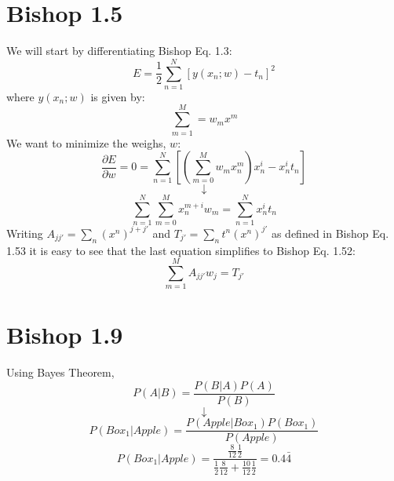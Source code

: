 \documentclass[12pt, letterpaper]{article}
\begin{document}
\section{Bishop 1.5}
We will start by differentiating Bishop Eq. 1.3:
\begin{equation}
E = \frac{1}{2} \sum_{n=1}^{N} [ y(x_n ; w) - t_n]^2
\end{equation}
where $y(x_n ; w)$ is given by:
\begin{equation}
\sum_{m=1}^{M} = w_m x^m
\end{equation}
We want to minimize the weighs, $w$:
\begin{equation}
\frac{\partial E}{\partial w} = 0 = \sum_{n=1}^{N} [( \sum_{m=0}^{M} w_m x_n^m) x_n^i - x_n^i t_n]
\end{equation}
\begin{equation}
\downarrow
\end{equation}
\begin{equation}
\sum_{n=1}^{N} \sum_{m=0}^{M} x_n^{m+i} w_m = \sum_{n=1}^{N} x_n^i t_n
\end{equation}
Writing $A_{j j'} = \sum_{n} (x^n)^{j + j'}$ and $T_{j'} = \sum_{n} t^n (x^n)^{j'}$ as defined in Bishop Eq. 1.53 it is easy to see that the last equation simplifies to Bishop Eq. 1.52:
\begin{equation}
 \sum_{m=1}^{M} A_{j j'} w_j = T_{j'}
\end{equation}

\section*{Bishop 1.9 }
Using Bayes Theorem, 
\begin{equation}
P(A|B) = \frac{P(B|A) P(A)}{P(B)}
\end{equation}
\begin{equation}
\downarrow
\end{equation}
\begin{equation}
P(Box_1 | Apple) = \frac{P(Apple | Box_1) P(Box_1)} {P(Apple)}
\end{equation}
\begin{equation}
P(Box_1 | Apple) = \frac{\frac{8}{12} \frac{1}{2}} {\frac{1}{2} \frac{8}{12} + \frac{10}{12} \frac{1}{2}} = 0.4\bar{4}
\end{equation}
\end{document}
